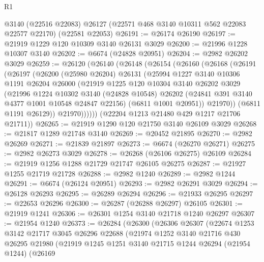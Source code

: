 \begin{lexlean}{R1}
\begin{coremodule}
    @3140
    (@22516 @22083)
    @26127
    (@22571 @468 @3140 @10311 @562 @22083 @22577 @22170)
    (@22581 @22053)
@26191 := @26174 @26190
@26197 := @21919 @1229 @120 @10309 @3140 @26131 @3029
@26200 := @21996 @1228 @10307 @3140
@26202 := @6674 (@24828 @20951)
@26204 := @2982 @26202 @3029
@26259 := @26120
    (@26140
      (@26148
        (@26154
          (@26160
            (@26168
              (@26191
                (@26197
                  (@26200
                    (@25980 @26204)
                    @26131
                    (@25994
                      @1227
                      @3140
                      @10306
                      @1191
                      @26204
                      @26000
                      (@21919
                        @1225
                        @120
                        @10304
                        @3140
                        @26202
                        @3029
                        (@21996
                          @1224
                          @10302
                          @3140
                          (@24828 @10548)
                          @26202
                          (@24841 @391 @3140 @4377 @1001 @10548 @24847 @22156)
                          (@6811 @1001 @20951))
                        @21970))
                    (@6811 @1191 @26129))
                  @21970))))))
      (@22204 @1213 @21480 @429 @1217 @21706 @21711))
@26265 := @21919 @1290 @120 @21750 @3140 @26109 @3029
@26268 := @21817 @1289 @21748 @3140
@26269 := @20452 @21895
@26270 := @2982 @26269
@26271 := @21839 @21897
@26273 := @6674 (@26270 @26271)
@26275 := @2982 @26273 @3029
@26278 := @26268 (@26106 @26275) @26109
@26284 := @21919 @1256 @1288 @21729 @21747 @26105 @26275
@26287 := @21927 @1255 @21719 @21728
@26288 := @2982 @1240
@26289 := @2982 @1244
@26291 := @6674 (@26124 @20951)
@26293 := @2982 @26291 @3029
@26294 := @26128 @26293
@26295 := @26289 @26294
@26296 := @21933 @26295
@26297 := @22653 @26296
@26300 := @26287 (@26288 @26297) @26105
@26301 := @21919 @1241
@26306 := @26301 @1254 @3140 @21718 @1240 @26297
@26307 := @21954 @1240
@26373 := @26284
    (@26300
      (@26306
        @26307
        (@22674
          @1253
          @3142
          @21717
          @3045
          @26296
          @22688
          (@21974
            @1252
            @3140
            @21716
            @430
            @26295
            @21980
            (@21919
              @1245
              @1251
              @3140
              @21715
              @1244
              @26294
              (@21954 @1244)
              (@26169

\end{coremodule}
\end{lexlean}
